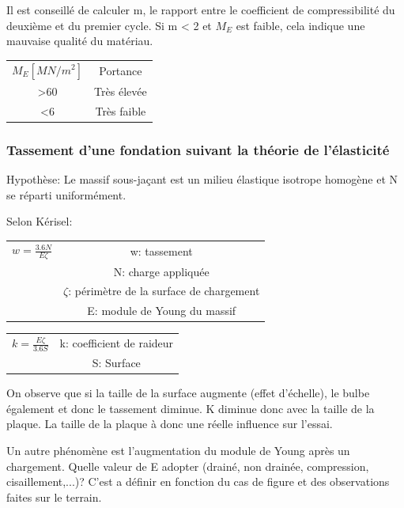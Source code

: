 Il est conseillé de calculer m, le rapport entre le coefficient de compressibilité du deuxième et du premier cycle. Si m < 2 et $M_E$ est faible, cela indique une mauvaise qualité du matériau.

\begin{center}
\begin{tabular}{c|c}
        $M_E [MN/m^2]$  &   Portance    \\
        >60             &   Très élevée \\
        <6              &   Très faible 
\end{tabular}
\end{center}

\subsubsection{Tassement d'une fondation suivant la théorie de l'élasticité}

Hypothèse: Le massif sous-jaçant est un milieu élastique isotrope homogène et N se réparti uniformément.

Selon Kérisel:
\begin{center}
\begin{tabular}{c|c}
$w = \frac{3.6 N}{E \zeta}$
                & w: tassement \\
                & N: charge appliquée \\
                & $\zeta$: périmètre de la surface de chargement \\
                & E: module de Young du massif
\end{tabular}
\end{center}

\begin{center}
\begin{tabular}{c|c}
$k = \frac{E \zeta}{3.6 S}$
                & k: coefficient de raideur \\
                & S: Surface 
\end{tabular}
\end{center}

On observe que si la taille de la surface augmente (effet d'échelle), le bulbe également et donc le tassement diminue. K diminue donc avec la taille de la plaque. La taille de la plaque à donc une réelle influence sur l'essai.

Un autre phénomène est l'augmentation du module de Young après un chargement. Quelle valeur de E adopter (drainé, non drainée, compression, cisaillement,...)? C'est a définir en fonction du cas de figure et des observations faites sur le terrain.


